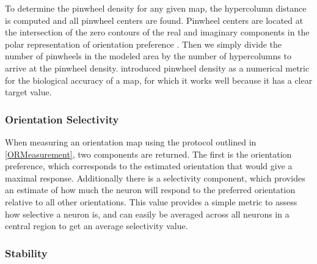 To determine the pinwheel density for any given map, the hypercolumn
distance is computed and all pinwheel centers are found. Pinwheel
centers are located at the intersection of the zero contours of the
real and imaginary components in the polar representation of
orientation preference \citep{Lowel1998}. Then we simply divide the
number of pinwheels in the modeled area by the number of hypercolumns
to arrive at the pinwheel density.  \cite{Stevens2013} introduced
pinwheel density as a numerical metric for the biological accuracy of
a map, for which it works well because it has a clear target value.

\subsubsection{Orientation Selectivity}

When measuring an orientation map using the protocol outlined in
\ref{ORMeasurement}, two components are returned.  The first is the
orientation preference, which corresponds to the estimated orientation
that would give a maximal response. Additionally there is a selectivity
component, which provides an estimate of how much the neuron will respond
to the preferred orientation relative to all other orientations. This
value provides a simple metric to assess how selective a neuron is, and can
easily be averaged across all neurons in a central region to get an
average selectivity value.

\subsubsection{Stability}

